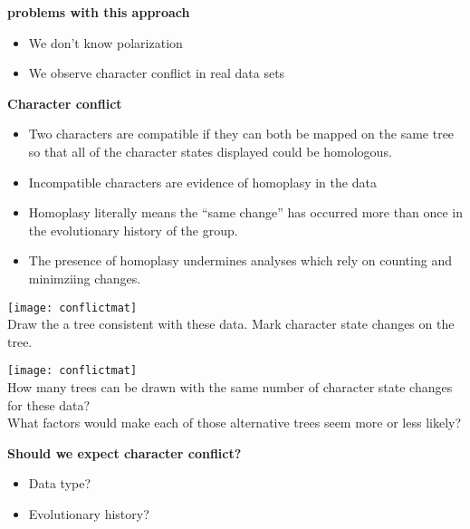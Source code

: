 \documentclass{beamer}
\begin{document}


\begin{frame}
\textbf{problems with this approach}
\begin{itemize}
 \item We don't know polarization
 \item We observe character conflict in real data sets
\end{itemize}
\end{frame}




\begin{frame}
\textbf{Character conflict}
\begin{itemize}
 \item Two characters are compatible if they can both be mapped on the same
tree so that all of the character states displayed could be homologous.
 \item Incompatible characters are evidence of homoplasy in the data
 \item Homoplasy literally means the “same change” has occurred more than once
in the evolutionary history of the group.
\item The presence of homoplasy undermines analyses which rely on counting and minimziing changes.
\end{itemize}
\end{frame}


\begin{frame}
 \texttt{[image: conflictmat]}\\
Draw the a tree consistent with these data. Mark character state changes on the tree.
\end{frame}


\begin{frame}
 \texttt{[image: conflictmat]}\\
How many trees can be drawn with the same number of character state changes for these data?\\
What factors would make each of those alternative trees seem more or less likely?
\end{frame}


\begin{frame}
\textbf{Should we expect character conflict?}
\begin{itemize}
 \item Data type?
 \item Evolutionary history?
\end{itemize}
\end{frame}
\end{document}
